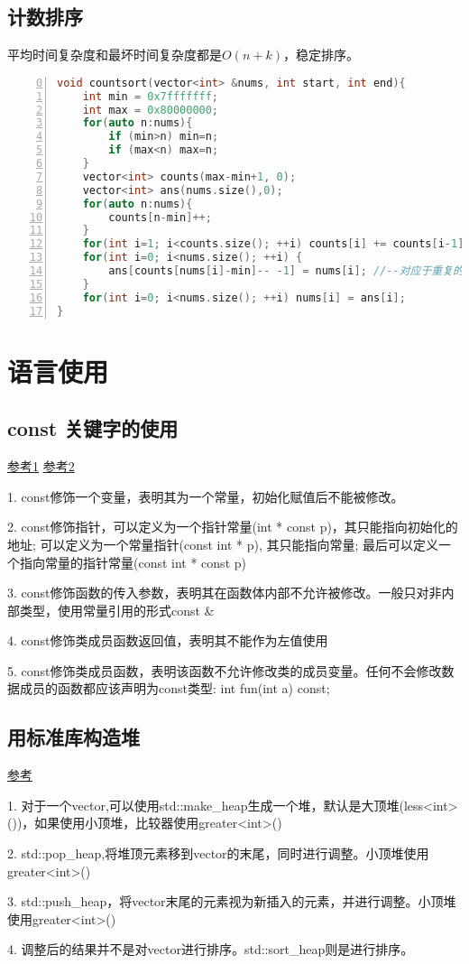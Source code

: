 \subsection{计数排序}
平均时间复杂度和最坏时间复杂度都是$O(n+k)$，稳定排序。
\begin{lstlisting}[language=c++,numbers=left,firstnumber = 0,numberstyle=\tiny,breaklines = true,keywordstyle=\color{blue!70},commentstyle=\color{red!50!green!50!blue!50},frame=shadowbox, rulesepcolor=\color{red!20!green!20!blue!20}]
void countsort(vector<int> &nums, int start, int end){
    int min = 0x7fffffff;
    int max = 0x80000000;
    for(auto n:nums){
        if (min>n) min=n;
        if (max<n) max=n;
    }
    vector<int> counts(max-min+1, 0);
    vector<int> ans(nums.size(),0);
    for(auto n:nums){
        counts[n-min]++;
    }
    for(int i=1; i<counts.size(); ++i) counts[i] += counts[i-1];
    for(int i=0; i<nums.size(); ++i) {
        ans[counts[nums[i]-min]-- -1] = nums[i]; //--对应于重复的数字
    }
    for(int i=0; i<nums.size(); ++i) nums[i] = ans[i];
}
\end{lstlisting}




\section{语言使用}
\subsection{const 关键字的使用}
\href{https://blog.csdn.net/lf1570180470/article/details/56677748}{参考1}
\href{https://www.cnblogs.com/azbane/p/7266747.html}{参考2}

1. const修饰一个变量，表明其为一个常量，初始化赋值后不能被修改。

2. const修饰指针，可以定义为一个指针常量(int * const p)，其只能指向初始化的地址; 可以定义为一个常量指针(const int * p), 其只能指向常量; 最后可以定义一个指向常量的指针常量(const int * const p)

3. const修饰函数的传入参数，表明其在函数体内部不允许被修改。一般只对非内部类型，使用常量引用的形式const \&

4. const修饰类成员函数返回值，表明其不能作为左值使用

5. const修饰类成员函数，表明该函数不允许修改类的成员变量。任何不会修改数据成员的函数都应该声明为const类型: int fun(int a) const;

\subsection{用标准库构造堆}
\href{http://www.cplusplus.com/reference/algorithm/make_heap/?kw=make_heap}{参考}

1. 对于一个vector,可以使用std::make_heap生成一个堆，默认是大顶堆(less<int>())，如果使用小顶堆，比较器使用greater<int>()

2. std::pop_heap,将堆顶元素移到vector的末尾，同时进行调整。小顶堆使用greater<int>()

3. std::push_heap，将vector末尾的元素视为新插入的元素，并进行调整。小顶堆使用greater<int>()

4. 调整后的结果并不是对vector进行排序。std::sort_heap则是进行排序。